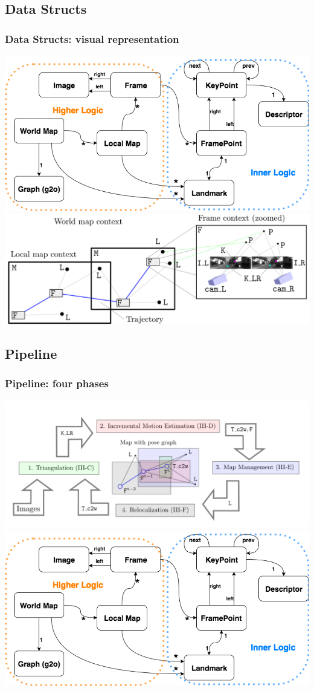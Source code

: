 \documentclass[16pt]{beamer}
\begin{document}
\subsection{Data Structs}
\begin{frame}
  \frametitle{Data Structs: visual representation }
  \centering
  \includegraphics[width=.7\textwidth]{dataStructs}
  \includegraphics[width=.7\textwidth]{HDslam5}
\end{frame}

\subsection{Pipeline}
\begin{frame}
  \frametitle{Pipeline: four  phases}
  \centering
  \includegraphics[width=.8\textwidth]{slam6}
  \includegraphics[width=.7\textwidth]{dataStructs}
\end{frame}
\end{document}
